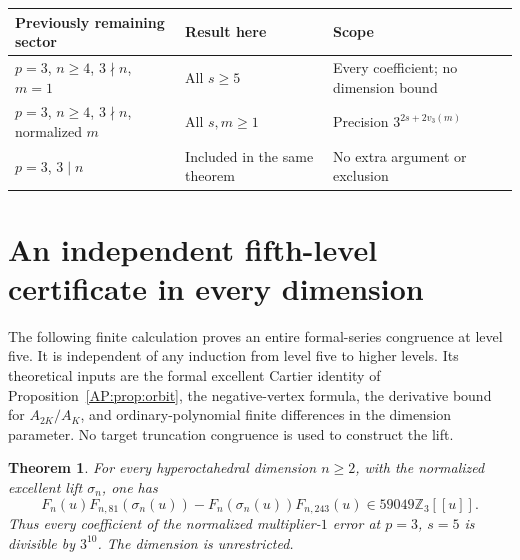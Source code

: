 \documentclass[11pt,a4paper]{article}
\newtheorem{theorem}{Theorem}[section]
\theoremstyle{definition}\newtheorem{definition}[theorem]{Definition}
\theoremstyle{remark}\newtheorem{remark}[theorem]{Remark}
\numberwithin{equation}{section}
\begin{document}
\begin{center}\small\renewcommand{\arraystretch}{1.2}
\begin{tabular}{p{53mm}p{39mm}p{51mm}}
\toprule
Previously remaining sector & Result here & Scope\\\midrule
$p=3$, $n\ge4$, $3\nmid n$, $m=1$ & All $s\ge5$ & Every coefficient; no dimension bound\\
$p=3$, $n\ge4$, $3\nmid n$, normalized $m$ & All $s,m\ge1$ & Precision $3^{2s+2v_3(m)}$\\
$p=3$, $3\mid n$ & Included in the same theorem & No extra argument or exclusion\\
\bottomrule
\end{tabular}
\end{center}

\section{An independent fifth-level certificate in every dimension}\label{AP:source-main-7}
\label{AP:sec:dimension-newton-level5}

The following finite calculation proves an entire formal-series
congruence at level five.  It is independent of any induction from
level five to higher levels.  Its theoretical inputs are the formal
excellent Cartier identity of Proposition~\ref{AP:prop:orbit}, the
negative-vertex formula, the derivative bound for $A_{2K}/A_K$, and
ordinary-polynomial finite differences in the dimension parameter.
No target truncation congruence is used to construct the lift.

\begin{theorem}\label{AP:thm:uniform-dimension-level5}
For every hyperoctahedral dimension $n\geq2$, with the normalized
excellent lift $\sigma_n$, one has
\[
 F_n(u)F_{n,81}(\sigma_n(u))-
 F_n(\sigma_n(u))F_{n,243}(u)
                  \in59049\mathbb Z_3[[u]].
\]
Thus every coefficient of the normalized multiplier-$1$ error at
$p=3$, $s=5$ is divisible by $3^{10}$.  The dimension is unrestricted.
\end{theorem}
\end{document}
